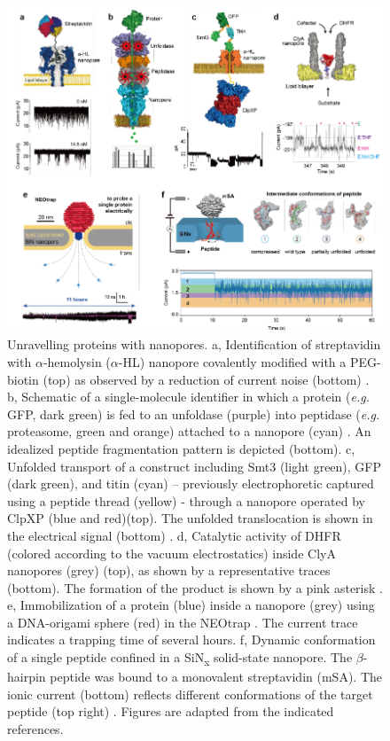 \begin{figure}[!htbp]
	\centering
	\includegraphics[width=1\linewidth]{figures/Figure6.2.pdf}
	\caption{Unravelling proteins with nanopores. a, Identification of streptavidin with $\alpha$-hemolysin ($\alpha$-HL) nanopore covalently modified with a PEG-biotin (top) as observed by a reduction of current noise (bottom) \cite{Movileanu2000}. b, Schematic of a single-molecule identifier in which a protein (\emph{e.g.} GFP, dark green) is fed to an unfoldase (purple) into peptidase (\emph{e.g.} proteasome, green and orange) attached to a nanopore (cyan) \cite{Zhang2020}. An idealized peptide fragmentation pattern is depicted (bottom). c, Unfolded transport of a construct including Smt3 (light green), GFP (dark green), and titin (cyan) – previously electrophoretic captured using a peptide thread (yellow) - through a nanopore operated by ClpXP (blue and red)(top). The unfolded translocation is shown in the electrical signal (bottom) \cite{Nivala2014}. d, Catalytic activity of DHFR (colored according to the vacuum electrostatics) inside ClyA nanopores (grey) (top), as shown by a representative traces (bottom). The formation of the product is shown by a pink asterisk \cite{Galenkamp2020b}. e, Immobilization of a protein (blue) inside a nanopore (grey) using a DNA-origami sphere (red) in the NEOtrap \cite{Schmid2021a}. The current trace indicates a trapping time of several hours. f, Dynamic conformation of a single peptide confined in a SiN\textsubscript{x} solid-state nanopore. The $\beta$-hairpin peptide was bound to a monovalent streptavidin (mSA). The ionic current (bottom) reflects different conformations of the target peptide (top right) \cite{Liu2021}. Figures are adapted from the indicated references.}
	\label{fig:fig6.2}
\end{figure}

